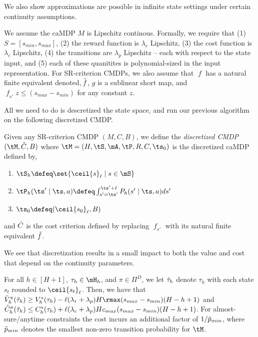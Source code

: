 \documentclass[pdftex, a4paper, 12pt]{article}
\newcommand{\round}[2]{\ceil{#2}_{#1}}
\newcommand{\cmax}{c_{max}}
\newcommand{\tV}{\Tilde{V}}
\newcommand{\tC}{\Tilde{C}}
\newcommand{\smax}{s_{max}}
\newcommand{\smin}{s_{min}}
\DeclareMathOperator*{\f}{\mathit{f}}
\begin{document}
We also show approximations are possible in infinite state settings under certain continuity assumptions.

\begin{assumption}[Continuity]\label{assum: continous}
    We assume the caMDP $M$ is Lipschitz continous. Formally, we require that (1) $S = [\smin, \smax]$, (2) the reward function is $\lambda_r$ Lipschitz, (3) the cost function is $\lambda_c$ Lipschitz, (4) the transitions are $\lambda_p$ Lipschitz -- each with respect to the state input, and (5) each of these quanitites is polynomial-sized in the input representation. For SR-criterion CMDPs, we also assume that $\f$ has a natural finite equivalent denoted, $\Tilde{\f}$, $g$ is a sublinear short map, and $\f_{s'} z \leq (\smax - \smin)$ for any constant $z$.
\end{assumption}

All we need to do is descretized the state space, and run our previous algorithm on the following discretized CMDP.
\begin{definition}\label{def: discretized-cmdp}
    Given any SR-criterion CMDP $(M, C, B)$, we define the \emph{discretized CMDP} $(\tM, \tC, B)$ where $\tM = (H, \tS, \mA, \tP, R, C, \ts_0) $ is the discretized caMDP defined by,
    \begin{enumerate}
        \item $\tS_h \defeq \set{\round{\ell}{s} \mid s \in \mS}$
        \item $\tP_h(\ts' \mid \ts, a) \defeq  \int_{s' = \ts'}^{\ts' + \ell} P_h(s' \mid \ts,a)ds'$
        \item $\ts_0 \defeq (\round{\ell}{s_0}, B)$
    \end{enumerate}
    and $\tC$ is the cost criterion defined by replacing $\f_{s'}$ with its natural finite equivalent $\Tilde{f}$.
\end{definition}

We see that discretization results in a small impact to both the value and cost that depend on the continuity parameters.

\begin{lemma}[Discretization]\label{lem: discretized}
    For all $h \in [H+1]$, $\tau_h \in \mH_h$, and $\pi \in \Pi^D$, we let $\Tilde{\tau}_h$ denote $\tau_h$ with each state $s_t$ rounded to $\round{\ell}{s_t}$. Then, we have that $\tV^{\pi}_h(\Tilde{\tau}_h) \geq V^*_h(\tau_h) - \ell (\lambda_r + \lambda_p)H\rmax(\smax - \smin)(H-h+1)$ and $\tC^{\pi}_h(\Tilde{\tau}_h) \leq C^*_h(\tau_h) + \ell (\lambda_c + \lambda_p)H\cmax(\smax - \smin)(H-h+1)$. For almost-sure/anytime constraints the cost incurs an additional factor of $1/\Tilde{p}_{min}$, where $\Tilde{p}_{min}$ denotes the smallest non-zero transition probability for $\tM$.
\end{lemma}
\end{document}
